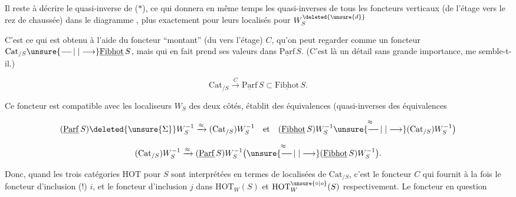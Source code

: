 Il reste à décrire le  quasi-inverse de ($*$), ce qui donnera en même temps les quasi-inverses  de tous les foncteurs verticaux (de l'étage vers le rez de chaussée) dans le diagramme , plus exactement pour leurs localisés pour $W_S^{\deleted{\unsure{d}}}$ 

C'est ce qui est obtenu à l'aide du foncteur ``montant'' (du  vers l'étage) $C$, qu'on peut regarder comme un foncteur $\mathrm{Cat}_{/S}\unsure{\mathrel{\relbar\joinrel\relbar\joinrel\vert}|\longrightarrow}\underline{\mathrm{Fibhot}}\,S$, mais qui en fait prend ses valeurs dans $\underline{\mathrm{Parf}}\,S$. (C'est là un détail sans grande importance, me semble-t-il.)

\[
\mathrm{Cat}_{/S}\xrightarrow{C}\underline{\mathrm{Parf}}\,S\subset\underline{\mathrm{Fibhot}}\,S.
\]

Ce foncteur  est compatible avec les localiseurs $W_S$ des deux côtés,   établit des équivalences (quasi-inverses des équivalences

\[
(\underline{\mathrm{Parf}}\,S)\deleted{\unsure{\Sigma}}W_S^{-1}\xrightarrow{\approx}(\mathrm{Cat}_{/S})W_S^{-1}
\quad\text{et}\quad
(\underline{\mathrm{Fibhot}}\,S)W_S^{-1}\overset{\approx}{\unsure{\mathrel{\relbar\joinrel\relbar\joinrel\vert}|\longrightarrow}}(\mathrm{Cat}_{/S})W_S^{-1}\bigr)
\]

\[
(\mathrm{Cat}_{/S})W_S^{-1}\xrightarrow{\approx}(\underline{\mathrm{Parf}}\,S)W_S^{-1}
\bigl(\overset{\approx}{\unsure{\mathrel{\relbar\joinrel\relbar\joinrel\vert}|\longrightarrow}}(\underline{\mathrm{Fibhot}}\,S)W_S^{-1}\bigr).
\]

Donc, quand les trois catégories $\mathrm{HOT}$ pour $S$ sont interprétées en termes de localisées de $\mathrm{Cat}_{/S}$, c'est le foncteur $C$  qui fournit à la fois le foncteur d'inclusion (!) $i$, et le foncteur d'inclusion $j$ dans $\mathrm{HOT}_{W}(S)$ et $\mathrm{HOT}_{W}^{\unsure{\circ|o}}(S)$ respectivement. Le foncteur en question

